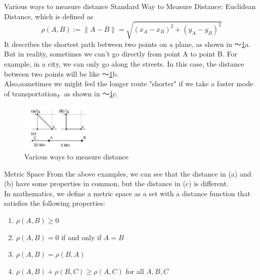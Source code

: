 \documentclass[xcolor=dvipsnames]{beamer}
\theoremstyle{remark}
\begin{document}
\begin{frame}{Various ways to measure distance}
  \hspace*{2em}Standard Way to Measure Distance: Euclidean Distance, which is defined as
$$
\rho(A, B) := \|A - B\| = \sqrt{(x_A - x_B)^2 + (y_A - y_B)^2}
$$
\hspace*{2em}It describes the shortest path between two points on a plane, as shown in \figurename～\ref{Fig1}a.\\
\hspace*{2em}But in reality, sometimes we can't go directly from point A to point B. For example, in a city, we can only go along the streets. In this case, the distance between two points will be like \figurename～\ref{Fig1}b.\\
\hspace*{2em}Also,sometimes we might feel the longer route "shorter" if we take a faster mode of transportation，as shown in \figurename～\ref{Fig1}c.


  \begin{figure}[H] %
      \centering       %
      \includegraphics[width=0.3\textwidth]{fig1.png} %
      \caption{Various ways to measure distance} %
      \label{Fig1}   %
  \end{figure}

\end{frame}
\begin{frame}{Metric Space}
  \hspace*{2em}From the above examples, we can see that the distance in (a) and (b) have some properties in common, but the distance in (c) is different.\\
  \hspace*{2em}In mathematics, we define a metric space as a set with a distance function that satisfies the following properties:
  \begin{enumerate}[label=\roman*.]
    \item $\rho(A, B) \geq 0$
    \item $\rho(A, B) = 0$ if and only if $A = B$
    \item $\rho(A, B) = \rho(B, A)$
    \item $\rho(A, B) + \rho(B, C) \geq \rho(A, C)$ for all $A, B, C$
  \end{enumerate}
\end{frame}
\end{document}
